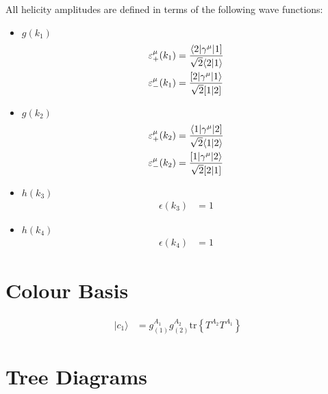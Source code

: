 \documentclass[a4paper]{article}
\newcommand{\Spaa}[1]{\langle #1 \rangle}
\newcommand{\Spab}[1]{\langle #1]}
\newcommand{\Spba}[1]{[ #1 \rangle}
\newcommand{\Spbb}[1]{[ #1 ]}
\begin{document}
All helicity amplitudes are defined in terms of the following wave functions:
\begin{itemize}
\item $g(k_{1})$ 
\begin{align}
\varepsilon^\mu_+(k_{1}) &=
   \frac{\Spab{2\vert\gamma^\mu\vert 1}}{%
   \sqrt{2}\Spaa{2\vert 1}}\\
\varepsilon^\mu_-(k_{1}) &=
   \frac{\Spba{2\vert\gamma^\mu\vert 1}}{%
   \sqrt{2}\Spbb{1\vert 2}}
\end{align}
\item $g(k_{2})$ 
\begin{align}
\varepsilon^\mu_+(k_{2}) &=
   \frac{\Spab{1\vert\gamma^\mu\vert 2}}{%
   \sqrt{2}\Spaa{1\vert 2}}\\
\varepsilon^\mu_-(k_{2}) &=
   \frac{\Spba{1\vert\gamma^\mu\vert 2}}{%
   \sqrt{2}\Spbb{2\vert 1}}
\end{align}
\item $h(k_3)$ 
\begin{align}
\epsilon(k_{3}) &= 1
\end{align}
\item $h(k_4)$ 
\begin{align}
\epsilon(k_{4}) &= 1
\end{align}
\end{itemize}

\section{Colour Basis}
\begin{align}
\vert c_{1}\rangle &=g^{A_{1}}_{(1)}g^{A_{2}}_{(2)}\textrm{tr}\left\{T^{A_{2}}T^{A_{1}}\right\}
\end{align}


\section{Tree Diagrams}

\end{document}
